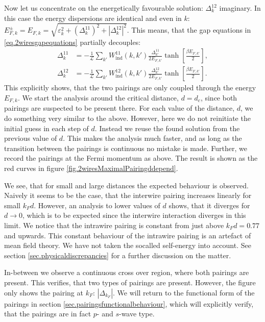 Now let us concentrate on the energetically favourable solution: $\Delta^{12}_k$ imaginary. In this case the energy dispersions are identical and even in $k$: $E^{\pm}_{F,k} = E_{F,k} = \sqrt{\varepsilon_k^2 + (\Delta^{11}_k)^2 + |\Delta^{12}_k|^2}$. This means, that the gap equations in \eqref{eq.2wiresgapequations} partially decouples: 
\begin{align}
\Delta^{11}_k &= -\frac{1}{\mathcal{L}}\sum_{k'} W_{\text{ind}}^{11}(k, k')\frac{\Delta^{11}_{k'}}{2E_{F,k'}}\tanh\left[\frac{\beta E_{F,k'}}{2}\right], \nonumber \\
\Delta^{12}_k &= -\frac{1}{\mathcal{L}}\sum_{k'} W_{\text{ind}}^{12}(k, k')\frac{\Delta^{12}_{k'}}{2E_{F,k'}}\tanh\left[\frac{\beta E_{F,k'}}{2}\right].
\label{eq.2wiresgapequationsDelta12imaginary}
\end{align} 
This explicitly shows, that the two pairings are only coupled through the energy $E_{F,k}$. We start the analysis around the critical distance, $d = d_c$, since both pairings are suspected to be present there. For each value of the distance, $d$, we do something very similar to the above. However, here we do not reinitiate the initial guess in each step of $d$. Instead we reuse the found solution from the previous value of $d$. This makes the analysis much faster, and as long as the transition between the pairings is continuous no mistake is made. Further, we record the pairings at the Fermi momentum as above. The result is shown as the red curves in figure \ref{fig.2wiresMaximalPairingddepend}.
 
We see, that for small and large distances the expected behaviour is observed. Naively it seems to be the case, that the interwire pairing increases linearly for small $k_Fd$. However, an analysis to lower values of $d$ shows, that it diverges for $d \to 0$, which is to be expected since the interwire interaction diverges in this limit. We notice that the intrawire pairing is constant from just above $k_Fd = 0.77$ and upwards. This constant behaviour of the intrawire pairing is an artefact of mean field theory. We have not taken the socalled self-energy into account. See section \ref{sec.physicaldiscrepancies} for a further discussion on the matter. 

In-between we observe a continuous cross over region, where both pairings are present. This verifies, that two types of pairings are present. However, the figure only shows the pairing at $k_F$: $|\Delta_{k_F}|$. We will return to the functional form of the pairings in section \ref{sec.pairingsfunctionalbehaviour}, which will explicitly verify, that the pairings are in fact $p$- and $s$-wave type. 

